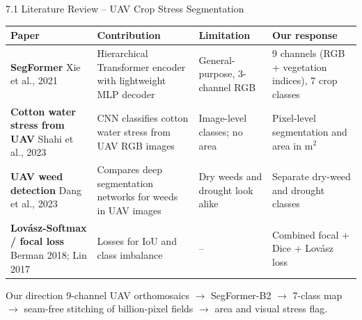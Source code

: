 \documentclass[aspectratio=169,10pt]{beamer}
\begin{document}
\begin{frame}{7.1 Literature Review -- UAV Crop Stress Segmentation}
\footnotesize
\renewcommand{\arraystretch}{1.45}
\begin{tabularx}{\textwidth}{@{}p{3.3cm}YYY@{}}
\toprule
\textbf{Paper} & \textbf{Contribution} & \textbf{Limitation} & \textbf{Our response} \\ \midrule
\textbf{SegFormer} \newline Xie et al., 2021 & Hierarchical Transformer encoder with lightweight MLP decoder & General-purpose, 3-channel RGB & 9 channels (RGB + vegetation indices), 7 crop classes \\
\textbf{Cotton water stress from UAV} \newline Shahi et al., 2023 & CNN classifies cotton water stress from UAV RGB images & Image-level classes; no area & Pixel-level segmentation and area in m$^2$ \\
\textbf{UAV weed detection} \newline Dang et al., 2023 & Compares deep segmentation networks for weeds in UAV images & Dry weeds and drought look alike & Separate dry-weed and drought classes \\
\textbf{Lov\'asz-Softmax / focal loss} \newline Berman 2018; Lin 2017 & Losses for IoU and class imbalance & -- & Combined focal + Dice + Lov\'asz loss \\
\bottomrule
\end{tabularx}
\begin{block}{Our direction}
\footnotesize 9-channel UAV orthomosaics $\rightarrow$ SegFormer-B2 $\rightarrow$ 7-class map $\rightarrow$ seam-free stitching of billion-pixel fields $\rightarrow$ area and visual stress flag.
\end{block}
\end{frame}
\end{document}
